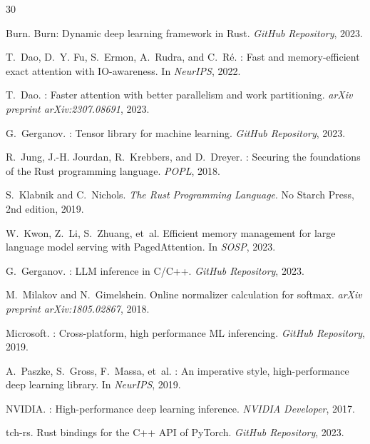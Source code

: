 
\begin{thebibliography}{30}

Burn.
\newblock Burn: Dynamic deep learning framework in {Rust}.
\newblock \emph{GitHub Repository}, 2023.

T.~Dao, D.~Y. Fu, S.~Ermon, A.~Rudra, and C.~R\'e.
: Fast and memory-efficient exact attention with {IO}-awareness.
\newblock In \emph{NeurIPS}, 2022.

T.~Dao.
: Faster attention with better parallelism and work partitioning.
\newblock \emph{arXiv preprint arXiv:2307.08691}, 2023.

G.~Gerganov.
: Tensor library for machine learning.
\newblock \emph{GitHub Repository}, 2023.

R.~Jung, J.-H. Jourdan, R.~Krebbers, and D.~Dreyer.
: Securing the foundations of the {Rust} programming language.
\newblock \emph{POPL}, 2018.

S.~Klabnik and C.~Nichols.
\newblock \emph{The Rust Programming Language}.
\newblock No Starch Press, 2nd edition, 2019.

W.~Kwon, Z.~Li, S.~Zhuang, et~al.
\newblock Efficient memory management for large language model serving with {PagedAttention}.
\newblock In \emph{SOSP}, 2023.

G.~Gerganov.
: LLM inference in {C/C++}.
\newblock \emph{GitHub Repository}, 2023.

M.~Milakov and N.~Gimelshein.
\newblock Online normalizer calculation for softmax.
\newblock \emph{arXiv preprint arXiv:1805.02867}, 2018.

Microsoft.
: Cross-platform, high performance {ML} inferencing.
\newblock \emph{GitHub Repository}, 2019.

A.~Paszke, S.~Gross, F.~Massa, et~al.
: An imperative style, high-performance deep learning library.
\newblock In \emph{NeurIPS}, 2019.

NVIDIA.
: High-performance deep learning inference.
\newblock \emph{NVIDIA Developer}, 2017.

tch-rs.
\newblock Rust bindings for the {C++} {API} of {PyTorch}.
\newblock \emph{GitHub Repository}, 2023.


\end{thebibliography}
